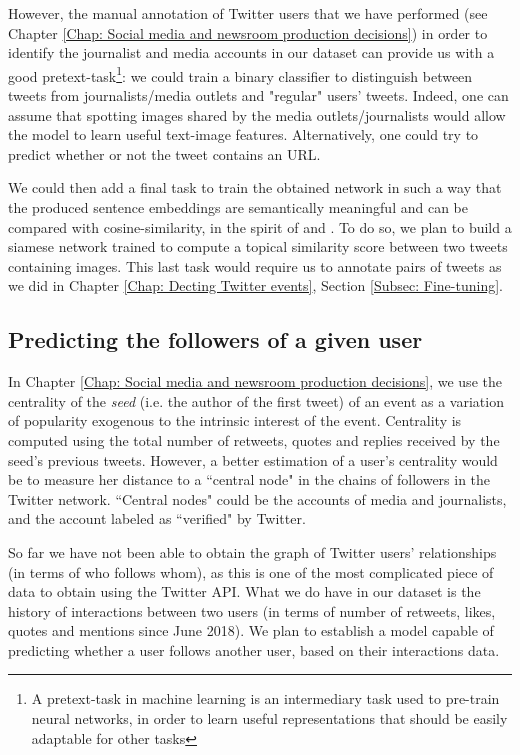 However, the manual annotation of Twitter users that we have performed (see Chapter \ref{Chap: Social media and newsroom production decisions}) in order to identify the journalist and media accounts in our dataset can provide us with a good pretext-task\footnote{A pretext-task in machine learning is an intermediary task used to pre-train neural networks, in order to learn useful representations that should be easily adaptable for other tasks}: we could train a binary classifier to distinguish between tweets from journalists/media outlets and "regular" users' tweets. Indeed, one can assume that spotting images shared by the media outlets/journalists would allow the model to learn useful text-image features. Alternatively, one could try to predict whether or not the tweet contains an URL.

We could then add a final task to train the obtained network in such a way that the produced
sentence embeddings are semantically meaningful and can be compared with cosine-similarity, in the spirit of \cite{reimers_2019_sentence} and \cite{danovitch2020linking}. To do so, we plan to build a siamese network trained to compute a topical similarity score between two tweets containing images. This last task would require us to annotate pairs of tweets as we did in Chapter \ref{Chap: Decting Twitter events}, Section \ref{Subsec: Fine-tuning}.


\subsection{Predicting the followers of a given user}

In Chapter \ref{Chap: Social media and newsroom production decisions}, we use the centrality of the \textit{seed} (i.e. the author of the first tweet) of an event as a variation of popularity exogenous to the intrinsic interest of the event. Centrality is computed using the total number of retweets, quotes and replies received by the seed's previous tweets. However, a better estimation of a user's centrality would be to measure her distance to a 
``central node" in the chains of followers in the Twitter network.
``Central nodes" could be the accounts of media and journalists, and the account labeled as ``verified" by Twitter.

So far we have not been able to obtain the graph of Twitter users' relationships (in terms of who follows whom), as this is one of the most complicated piece of data to obtain using the Twitter API. What we do have in our dataset is the history of interactions between two users (in terms of number of retweets, likes, quotes and mentions since June 2018). We plan to establish a model capable of predicting whether a user follows another user, based on their interactions data. 

